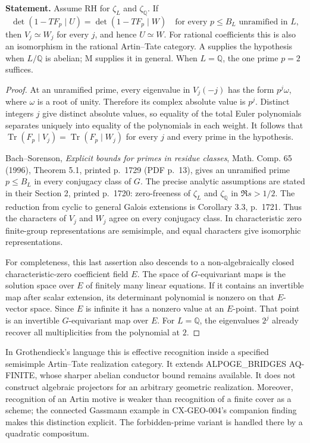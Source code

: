 \textbf{Statement.} Assume RH for $\zeta_L$ and $\zeta_{\mathbb Q}$.
If
\[
 \det(1-TF_p\mid U)=\det(1-TF_p\mid W)
 \quad\text{for every }p\le B_L\text{ unramified in }L,
\]
then $V_j\simeq W_j$ for every $j$, and hence $U\simeq W$.
For rational coefficients this is also an isomorphism in the rational
Artin--Tate category. A supplies the hypothesis when $L/\mathbb Q$ is
abelian; M supplies it in general. When $L=\mathbb Q$, the one prime $p=2$
suffices.

\begin{proof}
At an unramified prime, every eigenvalue in $V_j(-j)$ has the form
$p^j\omega$, where $\omega$ is a root of unity. Therefore its complex
absolute value is $p^j$. Distinct integers $j$ give distinct absolute
values, so equality of the total Euler polynomials separates uniquely into
equality of the polynomials in each weight. It follows that
$\operatorname{Tr}(F_p\mid V_j)=\operatorname{Tr}(F_p\mid W_j)$ for every
$j$ and every prime in the hypothesis.

Bach--Sorenson, \emph{Explicit bounds for primes in residue classes},
Math. Comp. 65 (1996), Theorem 5.1, printed p.~1729 (PDF p.~13), gives
an unramified prime $p\le B_L$ in every conjugacy class of $G$.
The precise analytic assumptions are stated in their Section 2,
printed p.~1720: zero-freeness of $\zeta_L$ and $\zeta_{\mathbb Q}$ in
$\Re s>1/2$. The reduction from cyclic to general Galois extensions is
Corollary 3.3, p.~1721. Thus the characters of $V_j$ and $W_j$ agree on
every conjugacy class. In characteristic zero finite-group representations
are semisimple, and equal characters give isomorphic representations.

For completeness, this last assertion also descends to a non-algebraically
closed characteristic-zero coefficient field $E$. The space of
$G$-equivariant maps is the solution space over $E$ of finitely many linear
equations. If it contains an invertible map after scalar extension, its
determinant polynomial is nonzero on that $E$-vector space. Since $E$ is
infinite it has a nonzero value at an $E$-point. That point is an invertible
$G$-equivariant map over $E$. For $L=\mathbb Q$, the eigenvalues $2^j$
already recover all multiplicities from the polynomial at $2$.
\end{proof}

In Grothendieck's language this is effective recognition inside a specified
semisimple Artin--Tate realization category. It extends
ALPOGE\_BRIDGES AQ-FINITE, whose sharper abelian conductor bound remains
available. It does not construct algebraic projectors for an arbitrary
geometric realization. Moreover, recognition of an Artin motive is weaker
than recognition of a finite cover as a scheme; the connected Gassmann
example in CX-GEO-004's companion finding makes this distinction explicit.
The forbidden-prime variant is handled there by a quadratic compositum.

